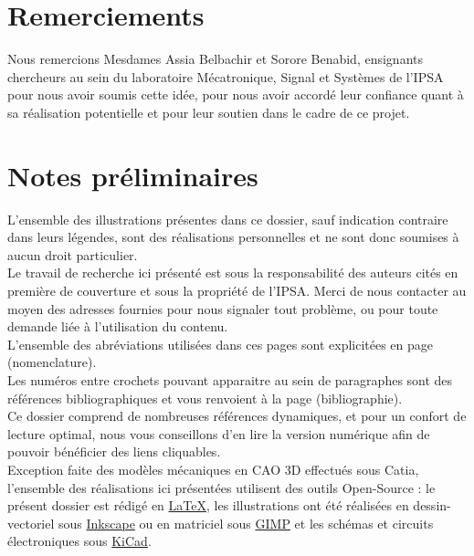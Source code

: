 \documentclass[11pt]{article}
\begin{document}


\setcounter{secnumdepth}{5}
\setcounter{tocdepth}{5}

\newpage
\tableofcontents
\newpage
{}

\section*{Remerciements}

	Nous remercions Mesdames Assia Belbachir et Sorore Benabid, ensignants chercheurs au sein du laboratoire Mécatronique, Signal et Systèmes de l'IPSA pour nous avoir soumis cette idée, pour nous avoir accordé leur confiance quant à sa réalisation potentielle et pour leur soutien dans le cadre de ce projet.

	\vspace{80pt}

\section*{Notes préliminaires}
	L'ensemble des illustrations présentes dans ce dossier, sauf indication contraire dans leurs légendes, sont des réalisations personnelles et ne sont donc soumises à aucun droit particulier.\\

	Le travail de recherche ici présenté est sous la responsabilité des auteurs cités en première de couverture et sous la propriété de l'IPSA. Merci de nous contacter au moyen des adresses fournies pour nous signaler tout problème, ou pour toute demande liée à l'utilisation du contenu.\\

	L'ensemble des abréviations utilisées dans ces pages sont explicitées en page \pageref{nomenclature} (nomenclature).\\

	Les numéros entre crochets pouvant apparaitre au sein de paragraphes sont des références bibliographiques et vous renvoient à la page \pageref{bibliographie} (bibliographie).\\

	Ce dossier comprend de nombreuses références dynamiques, et pour un confort de lecture optimal, nous vous conseillons d'en lire la version numérique afin de pouvoir bénéficier des liens cliquables.\\

	Exception faite des modèles mécaniques en CAO 3D effectués sous Catia\textsuperscript{\textregistered}, l'ensemble des réalisations ici présentées utilisent des outils Open-Source : le présent dossier est rédigé en \href{https://www.latex-project.org/}{\LaTeX}, les illustrations ont été réalisées en dessin-vectoriel sous \href{https://inkscape.org/fr/}{Inkscape} ou en matriciel sous \href{https://www.gimp.org/}{GIMP} et les schémas et circuits électroniques sous \href{http://kicad-pcb.org/}{KiCad}.
\end{document}
